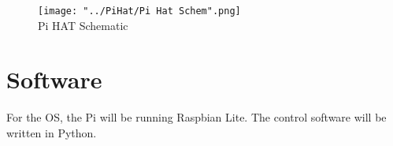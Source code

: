 \documentclass[a4paper,openany,nomultitoc]{dndbook}
\begin{document}
\begin{figure}[hb]
	\begin{center}
		\texttt{[image: "../PiHat/Pi Hat Schem".png]}\\
		{Pi HAT Schematic}
	\end{center}
\end{figure}

\FloatBarrier
\chapter{Software}
\FloatBarrier
\begin{multicols*}{2}

For the OS, the Pi will be running Raspbian Lite.  The control software will be written in Python.

\end{multicols*}
\end{document}
